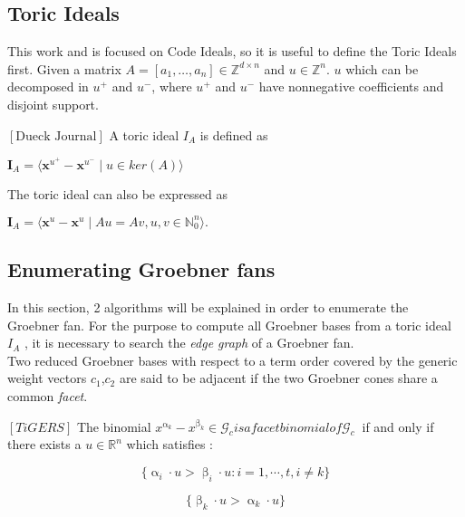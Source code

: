 \subsection{Toric Ideals}
This work and is focused on Code Ideals, so it is useful to define the Toric Ideals first. Given a matrix $A =\left[a_{1},\dots, a_{n}  \right] \in \mathbb{Z}^{d \times n } $ and $u \in \mathbb{Z}^{n}$. $u$ which can be decomposed in $u^{+} $ and $u^{-}$, where $u^{+} $ and $u^{-}$ have nonnegative coefficients and disjoint support.

\begin{env_definition}
$\left[ \textrm{Dueck Journal} \right] $ A toric ideal $I_{A}$ is defined as
\begin{center}
$ \textbf{I}_{A} = \langle \textbf{x}^{u^{+}} - \textbf{x}^{u^{-}} \mid u \in ker \left(  A \right) \rangle  $
\end{center}


\end{env_definition}

The toric ideal can also be expressed as
\begin{center}
$ \textbf{I}_{A} =  \langle \textbf{x}^{u} - \textbf{x}^{u} \mid Au = Av, u,v \in \mathbb{N}^{n}_{0} \rangle .$
\end{center}



\subsection{Enumerating Groebner fans}

In this section, 2 algorithms will be explained in order to enumerate the Groebner fan.
For the purpose to compute all Groebner bases from a toric ideal $I_A$ , it is necessary to search the \textit{edge graph} of a Groebner fan.\\
Two reduced Groebner bases with respect to a term order covered by the generic weight vectors $c_{1}$,$c_{2}$ are said to be adjacent if the two Groebner cones share a common \textit{facet}.

\begin{env_definition}
$\left[TiGERS \right]  $ 
The binomial $x^{\upalpha_{k}}-x^{\upbeta_k} \in \mathcal{G}_c is a facet binomial of \mathcal{G}_c~$ if and only if there exists a $u \in \mathbb{R}^{n}$ which satisfies :
\begin{center}
\begin{enumerate}

\end{enumerate}
\item
\[ \lbrace \upalpha_{i} \cdot u > \upbeta_{i} \cdot u : i = 1, \cdots , t, i \neq k \rbrace  
\]
\item
\[ \lbrace \upbeta_{k} \cdot u > \upalpha_{k} \cdot u \rbrace \]

\end{center} 

\end{env_definition}

